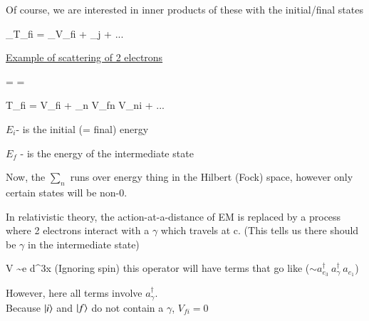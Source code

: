 {Of course, we are interested in inner products of these with the initial/final states

\be
{}_{T_{fi}} = _{V_{fi}} + \sum_j  + ...
\ee
 
\underline{Example of scattering of 2 electrons}

\be
{} =  \hspace*{1in}   = 
\ee


\be
T_{fi} = V_{fi} + \sum_n V_{fn}  V_{ni} + ...
\ee

\bi
\item[-] $E_i$- is the initial (= final) energy
\item[-] $E_f$ - is the energy of the intermediate state
\ei

Now, the $\sum_n$ runs over energy thing in the Hilbert (Fock) space, however only certain states will be non-0.

In relativistic theory, the action-at-a-distance of EM is replaced by a process where 2 electrons interact with a $\gamma$ which travels at c. 
(This tells us there should be $\gamma$ in the intermediate state)


\be
V \sim e \int d^3x \psi \phi \psi  \hspace*{0.3in} \textrm{(Ignoring spin)}
\ee
this operator will have terms that go like ($\sim a_{e_3}^\dagger\ a_{\gamma}^\dagger\ a_{e_1}$)


However, here all terms involve $a_{\gamma}^\dagger$.\\
Because $\ket{i}$ and $\ket{f}$ do not contain a $\gamma$, $  V_{fi} = 0$

}
